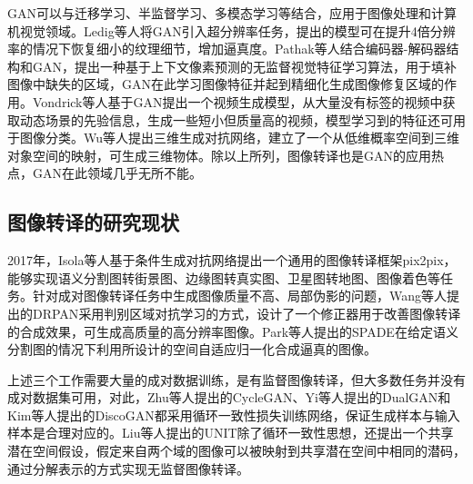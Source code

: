 GAN可以与迁移学习、半监督学习、多模态学习等结合，应用于图像处理和计算机视觉领域。Ledig等人\cite{ledig2017photo}将GAN引入超分辨率任务，提出的模型可在提升4倍分辨率的情况下恢复细小的纹理细节，增加逼真度。Pathak等人\cite{pathak2016context}结合编码器-解码器结构和GAN，提出一种基于上下文像素预测的无监督视觉特征学习算法，用于填补图像中缺失的区域，GAN在此学习图像特征并起到精细化生成图像修复区域的作用。Vondrick等人\cite{vondrick2016generating}基于GAN提出一个视频生成模型，从大量没有标签的视频中获取动态场景的先验信息，生成一些短小但质量高的视频，模型学习到的特征还可用于图像分类。Wu等人\cite{wu2016learning}提出三维生成对抗网络，建立了一个从低维概率空间到三维对象空间的映射，可生成三维物体。除以上所列，图像转译也是GAN的应用热点，GAN在此领域几乎无所不能。

\subsection{图像转译的研究现状}

2017年，Isola等人基于条件生成对抗网络提出一个通用的图像转译框架pix2pix\cite{isola2017image}，能够实现语义分割图转街景图、边缘图转真实图、卫星图转地图、图像着色等任务。针对成对图像转译任务中生成图像质量不高、局部伪影的问题，Wang等人提出的DRPAN\cite{wang2019discriminative}采用判别区域对抗学习的方式，设计了一个修正器用于改善图像转译的合成效果，可生成高质量的高分辨率图像。Park等人提出的SPADE\cite{park2019semantic}在给定语义分割图的情况下利用所设计的空间自适应归一化合成逼真的图像。

上述三个工作需要大量的成对数据训练，是有监督图像转译，但大多数任务并没有成对数据集可用，对此，Zhu等人提出的CycleGAN\cite{zhu2017unpaired}、Yi等人提出的DualGAN\cite{yi2017dualgan}和Kim等人提出的DiscoGAN\cite{kim2017learning}都采用循环一致性损失训练网络，保证生成样本与输入样本是合理对应的。Liu等人提出的UNIT\cite{liu2017unsupervised}除了循环一致性思想，还提出一个共享潜在空间假设，假定来自两个域的图像可以被映射到共享潜在空间中相同的潜码，通过分解表示的方式实现无监督图像转译。

